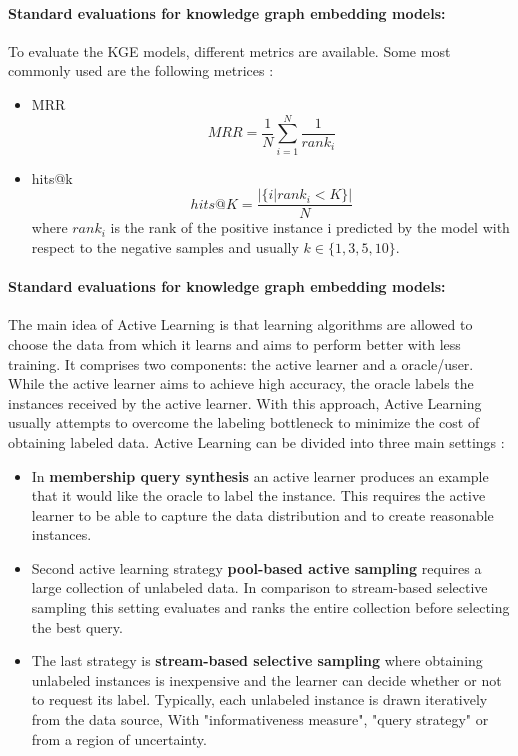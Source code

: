 \paragraph{\textbf{Standard evaluations for knowledge graph embedding models:}}  
To evaluate the \ac{KGE} models, different metrics are available.
Some most commonly used are the following metrices \cite{kotnis2017analysis}:
\begin{itemize}
    \item 
    \ac{MRR}
    $$MRR = \frac{1}{N} \sum_{i=1}^{N}\frac{1}{rank_i}$$
    \item 
    hits@k
    $$hits@K = \frac{|\{i | rank_i < K\}|}{N}$$
    where $rank_i$ is the rank of the positive instance i predicted by the
    model with respect to the negative samples and usually $k \in \{1,3,5,10\}$.
\end{itemize}

\paragraph{\textbf{Standard evaluations for knowledge graph embedding models:}}
The main idea of Active Learning is that learning algorithms are allowed to choose the data from which it learns and aims to perform better with less training.
It comprises two components: the active learner and a oracle/user.
While the active learner aims to achieve high accuracy, the oracle labels the instances received by the active learner.
With this approach, Active Learning usually attempts to overcome the labeling bottleneck to minimize the cost of obtaining labeled data.
Active Learning can be divided into three main settings \cite{Settles2009ActiveLL}:
\begin{itemize}
    \item 
    In \textbf{membership query synthesis} an active learner produces an example that it would like the oracle to label the instance.
    This requires the active learner to be able to capture the data distribution and to create reasonable instances.
    
    \item 
    Second active learning strategy  \textbf{pool-based active sampling} requires a large collection of unlabeled data.
    In comparison to stream-based selective sampling this setting evaluates and ranks the entire collection before selecting the best query.
    
    
    \item 
    The last strategy is \textbf{stream-based selective sampling} where obtaining unlabeled instances is inexpensive and the learner can decide whether or not to request its label.
    Typically, each unlabeled instance is drawn iteratively from the data source,
    With "informativeness measure", "query strategy" or from a region of uncertainty.
    
\end{itemize}







